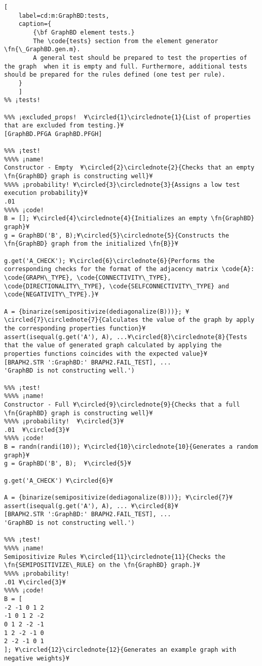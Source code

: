 \documentclass{tufte-handout}
\begin{document}
\begin{lstlisting}[
	label=cd:m:GraphBD:tests,
	caption={
		{\bf GraphBD element tests.}
		The \code{tests} section from the element generator \fn{\_GraphBD.gen.m}.
		A general test should be prepared to test the properties of the graph  when it is empty and full. Furthermore, additional tests should be prepared for the rules defined (one test per rule).
	}
	]			
%% ¡tests!

%%% ¡excluded_props!  ¥\circled{1}\circlednote{1}{List of properties that are excluded from testing.}¥
[GraphBD.PFGA GraphBD.PFGH]

%%% ¡test!
%%%% ¡name!
Constructor - Empty  ¥\circled{2}\circlednote{2}{Checks that an empty \fn{GraphBD} graph is constructing well}¥
%%%% ¡probability! ¥\circled{3}\circlednote{3}{Assigns a low test execution probability}¥
.01
%%%% ¡code!
B = []; ¥\circled{4}\circlednote{4}{Initializes an empty \fn{GraphBD} graph}¥
g = GraphBD('B', B);¥\circled{5}\circlednote{5}{Constructs the \fn{GraphBD} graph from the initialized \fn{B}}¥

g.get('A_CHECK'); ¥\circled{6}\circlednote{6}{Performs the corresponding checks for the format of the adjacency matrix \code{A}: \code{GRAPH\_TYPE}, \code{CONNECTIVITY\_TYPE}, \code{DIRECTIONALITY\_TYPE}, \code{SELFCONNECTIVITY\_TYPE} and \code{NEGATIVITY\_TYPE}.}¥

A = {binarize(semipositivize(dediagonalize(B)))}; ¥\circled{7}\circlednote{7}{Calculates the value of the graph by apply the corresponding properties function}¥
assert(isequal(g.get('A'), A), ...¥\circled{8}\circlednote{8}{Tests that the value of generated graph calculated by applying the properties functions coincides with the expected value}¥
[BRAPH2.STR ':GraphBD:' BRAPH2.FAIL_TEST], ...
'GraphBD is not constructing well.')

%%% ¡test!
%%%% ¡name!
Constructor - Full ¥\circled{9}\circlednote{9}{Checks that a full \fn{GraphBD} graph is constructing well}¥
%%%% ¡probability!  ¥\circled{3}¥
.01  ¥\circled{3}¥
%%%% ¡code!
B = randn(randi(10)); ¥\circled{10}\circlednote{10}{Generates a random graph}¥
g = GraphBD('B', B);  ¥\circled{5}¥

g.get('A_CHECK') ¥\circled{6}¥

A = {binarize(semipositivize(dediagonalize(B)))}; ¥\circled{7}¥
assert(isequal(g.get('A'), A), ... ¥\circled{8}¥
[BRAPH2.STR ':GraphBD:' BRAPH2.FAIL_TEST], ...
'GraphBD is not constructing well.')

%%% ¡test!
%%%% ¡name!
Semipositivize Rules ¥\circled{11}\circlednote{11}{Checks the \fn{SEMIPOSITIVIZE\_RULE} on the \fn{GraphBD} graph.}¥
%%%% ¡probability!
.01 ¥\circled{3}¥
%%%% ¡code!
B = [
-2 -1 0 1 2
-1 0 1 2 -2
0 1 2 -2 -1
1 2 -2 -1 0
2 -2 -1 0 1
]; ¥\circled{12}\circlednote{12}{Generates an example graph with negative weights}¥


\end{lstlisting}
\end{document}
